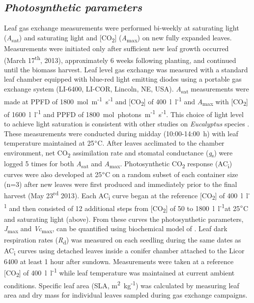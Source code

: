 \documentclass[a4paper]{article}\usepackage[]{graphicx}\usepackage[]{color}
\begin{document}
\subsection*{\textit{Photosynthetic parameters}}
Leaf gas exchange measurements were performed bi-weekly at saturating light (\textit{A}\textsubscript{sat}) and saturating light and [CO\textsubscript{2}] (\textit{A}\textsubscript{max}) on new fully expanded leaves. Measurements were initiated only after sufficient new leaf growth occurred (March 17\textsuperscript{th}, 2013), approximately 6 weeks following planting, and continued until the biomass harvest. Leaf level gas exchange was measured with a standard leaf chamber equipped with blue-red light emitting diodes using a portable gas exchange system (LI-6400, LI-COR, Lincoln, NE, USA). \textit{A}\textsubscript{sat} measurements were made at PPFD of 1800~{\textmugreek}mol~m\textsuperscript{-1}~s\textsuperscript{-1} and [CO\textsubscript{2}] of 400~{\textmugreek}l~l\textsuperscript{-1} and \textit{A}\textsubscript{max} with [CO\textsubscript{2}] of 1600~{\textmugreek}l~l\textsuperscript{-1} and PPFD of 1800~{\textmugreek}mol~photons~m\textsuperscript{-1}~s\textsuperscript{-1}. This choice of light level to achieve light saturation is consistent with other studies on \textit{Eucalyptus} species \citep{kallarackal1997ecophysiological,pinkard1998photosynthetic,crous2013photosynthesis,drake2014capacity}. These measurements were conducted during midday (10:00-14:00~h) with leaf temperature maintained at 25$\degree$C. After leaves acclimated to the chamber environment, net CO\textsubscript{2} assimilation rate and stomatal conductance (\textit{g}\textsubscript{s}) were logged 5 times for both \textit{A}\textsubscript{sat} and \textit{A}\textsubscript{max}. Photosynthetic CO\textsubscript{2} response (AC\textsubscript{i}) curves were also developed at 25$\degree$C on a random subset of each container size (n=3) after new leaves were first produced and immediately prior to the final harvest (May 23\textsuperscript{rd} 2013). Each AC\textsubscript{i} curve began at the reference [CO\textsubscript{2}] of 400~{\textmugreek}l~l\textsuperscript{-1} and then consisted of 12 additional steps from [CO\textsubscript{2}] of 50 to 1800~{\textmugreek}l~l\textsuperscript{-1}at 25$\degree$C and saturating light (above). From these curves the photosynthetic parameters, \textit{J}\textsubscript{max} and \textit{Vc}\textsubscript{max}, can be quantified using biochemical model of \citet{farquhar1980biochemical}. Leaf dark respiration rates (\textit{R}\textsubscript{d}) was measured on each seedling during the same dates as AC\textsubscript{i} curves using detached leaves inside a conifer chamber attached to the Licor 6400 at least 1 hour after sundown.   Measurements were taken at a reference [CO\textsubscript{2}] of 400~{\textmugreek}l~l\textsuperscript{-1} while leaf temperature was maintained at current ambient conditions. Specific leaf area (SLA, m\textsuperscript{2}~kg\textsuperscript{-1}) was calculated by measuring leaf area and dry mass for individual leaves sampled during gas exchange campaigns.
\end{document}
